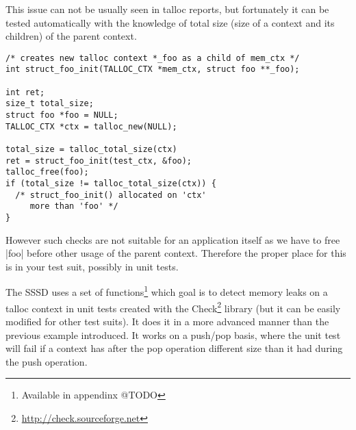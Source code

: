This issue can not be usually seen in talloc reports, but fortunately it can be
tested automatically with the knowledge of total size (size of a context and
its children) of the parent context.

\begin{lstlisting}[caption={Memory leaks detection \#1},
morekeywords={talloc_total_size,talloc_free}]
/* creates new talloc context *_foo as a child of mem_ctx */
int struct_foo_init(TALLOC_CTX *mem_ctx, struct foo **_foo);

int ret;
size_t total_size;
struct foo *foo = NULL;
TALLOC_CTX *ctx = talloc_new(NULL);

total_size = talloc_total_size(ctx)
ret = struct_foo_init(test_ctx, &foo);
talloc_free(foo);
if (total_size != talloc_total_size(ctx)) {
  /* struct_foo_init() allocated on 'ctx'
     more than 'foo' */
}
\end{lstlisting}

However such checks are not suitable for an application itself as we have to
free |foo| before other usage of the parent context. Therefore the proper place
for this is in your test suit, possibly in unit tests.

The SSSD uses a set of functions\footnote{Available in appendinx @TODO} which
goal is to detect memory leaks on a talloc context in unit tests created with
the Check\footnote{\url{http://check.sourceforge.net}} library (but it can be
easily modified for other test suits). It does it in a more advanced manner than
the previous example introduced. It works on a push/pop basis, where the unit
test will fail if a context has after the pop operation different size than it
had during the push operation.

